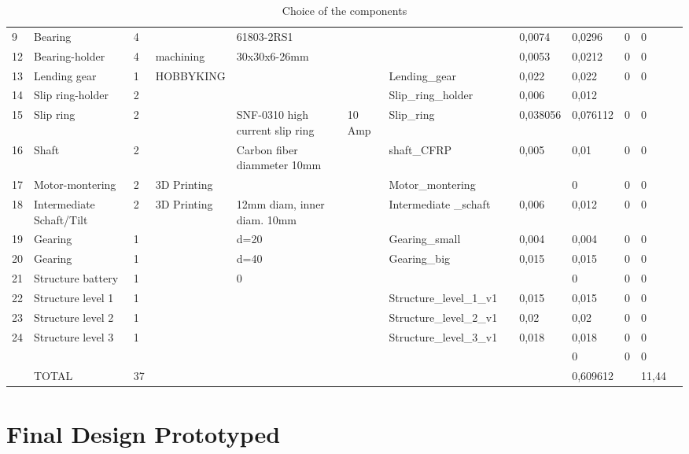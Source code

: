 \begin{landscape}
\begin{table}[]
\begin{tabular}{llp{0.5cm}lp{3.0cm}llllllll}
\midrule
9 & Bearing & 4 &  & 61803-2RS1 &  &  &  & 0,0074 & 0,0296 & 0 & 0 &  \\
12 & Bearing-holder & 4 & machining & 30x30x6-26mm &  &  &  & 0,0053 & 0,0212 & 0 & 0 &  \\
13 & Lending gear & 1 & HOBBYKING &  &  & Lending\_gear &  & 0,022 & 0,022 & 0 & 0 &  \\
14 & Slip ring-holder & 2 &  &  &  & Slip\_ring\_holder &  & 0,006 & 0,012 &  &  &  \\
15 & Slip ring & 2 &  & SNF-0310 high current slip ring & 10 Amp & Slip\_ring &  & 0,038056 & 0,076112 & 0 & 0 &  \\
16 & Shaft & 2 &  & Carbon fiber diammeter 10mm &  & shaft\_CFRP &  & 0,005 & 0,01 & 0 & 0 &  \\
17 & Motor-montering & 2 & 3D Printing &  &  & Motor\_montering &  &  & 0 & 0 & 0 &  \\
18 & Intermediate Schaft/Tilt & 2 & 3D Printing & 12mm diam, inner diam. 10mm &  & Intermediate \_schaft &  & 0,006 & 0,012 & 0 & 0 &  \\
19 & Gearing & 1 &  & d=20 &  & Gearing\_small &  & 0,004 & 0,004 & 0 & 0 &  \\
20 & Gearing & 1 &  & d=40 &  & Gearing\_big &  & 0,015 & 0,015 & 0 & 0 &  \\
21 & Structure battery & 1 &  & 0 &  &  &  &  & 0 & 0 & 0 &  \\
22 & Structure level 1 & 1 &  &  &  & Structure\_level\_1\_v1 &  & 0,015 & 0,015 & 0 & 0 &  \\
23 & Structure level 2 & 1 &  &  &  & Structure\_level\_2\_v1 &  & 0,02 & 0,02 & 0 & 0 &  \\
24 & Structure level 3 & 1 &  &  &  & Structure\_level\_3\_v1 &  & 0,018 & 0,018 & 0 & 0 &  \\
 &  &  &  &  &  &  &  &  & 0 & 0 & 0 &  \\
 & TOTAL & 37 &  &  &  &  &  &  & 0,609612 &  & 11,44 & \\
 \bottomrule 
\end{tabular}
\caption{Choice of the components}
\label{design:choice}
\end{table}
\end{landscape}
\section{Final Design Prototyped}
